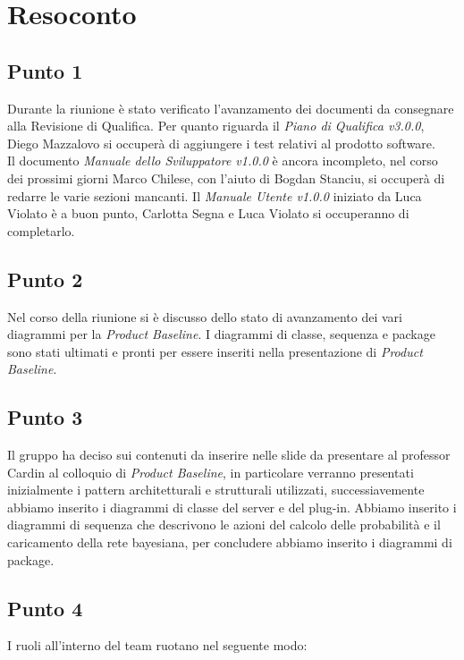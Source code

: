 \section{Resoconto}

\subsection{Punto 1}
Durante la riunione è stato verificato l'avanzamento dei documenti da consegnare alla Revisione di Qualifica.
Per quanto riguarda il \textit{Piano di Qualifica v3.0.0}, Diego Mazzalovo si occuperà di aggiungere i test relativi al prodotto software. \\
Il documento \textit{Manuale dello Sviluppatore v1.0.0} è ancora incompleto, nel corso dei prossimi giorni Marco Chilese, con l'aiuto di Bogdan Stanciu, si occuperà di redarre le varie sezioni mancanti. Il \textit{Manuale Utente v1.0.0} iniziato da Luca Violato è a buon punto, Carlotta Segna e Luca Violato si occuperanno di completarlo.

\subsection{Punto 2}
Nel corso della riunione si è discusso dello stato di avanzamento dei vari diagrammi per la \textit{Product Baseline}. I diagrammi di classe, sequenza e package sono stati ultimati e pronti per essere inseriti nella presentazione di \textit{Product Baseline}.

\subsection{Punto 3}
Il gruppo ha deciso sui contenuti da inserire nelle slide da presentare al professor Cardin al colloquio di \textit{Product Baseline}, in particolare verranno presentati inizialmente i pattern architetturali e strutturali  utilizzati, successiavemente abbiamo inserito i diagrammi di classe del server e del plug-in. Abbiamo inserito i diagrammi di sequenza che descrivono le azioni del calcolo delle probabilità e il caricamento della rete bayesiana, per concludere abbiamo inserito i diagrammi di package.  

\newpage
\subsection{Punto 4}
I ruoli all'interno del team ruotano nel seguente modo:\\

